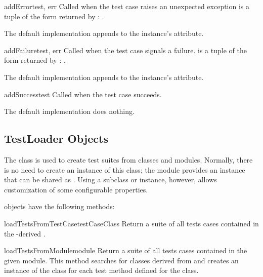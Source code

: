\begin{methoddesc}[TestResult]{addError}{test, err}
  Called when the test case  raises an unexpected exception
   is a tuple of the form returned by :
  .
  
  The default implementation appends  to
  the instance's  attribute.
\end{methoddesc}

\begin{methoddesc}[TestResult]{addFailure}{test, err}
  Called when the test case  signals a failure.
   is a tuple of the form returned by
  :  .
  
  The default implementation appends  to
  the instance's  attribute.
\end{methoddesc}

\begin{methoddesc}[TestResult]{addSuccess}{test}
  Called when the test case  succeeds.
  
  The default implementation does nothing.
\end{methoddesc}



\subsection{TestLoader Objects
            \label{testloader-objects}}

The  class is used to create test suites from
classes and modules.  Normally, there is no need to create an instance
of this class; the  module provides an instance
that can be shared as .
Using a subclass or instance, however, allows customization of some
configurable properties.

 objects have the following methods:

\begin{methoddesc}[TestLoader]{loadTestsFromTestCase}{testCaseClass}
  Return a suite of all tests cases contained in the
  -derived .
\end{methoddesc}

\begin{methoddesc}[TestLoader]{loadTestsFromModule}{module}
  Return a suite of all tests cases contained in the given module.
  This method searches  for classes derived from
   and creates an instance of the class for each test
  method defined for the class.

\end{methoddesc}

